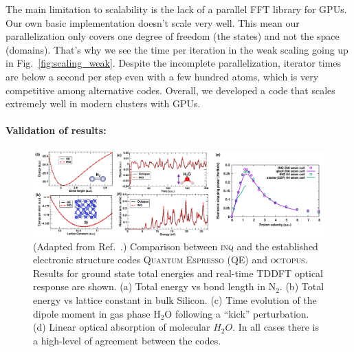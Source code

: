 The main limitation to scalability is the lack of a parallel FFT library for GPUs. 
Our own basic implementation doesn't scale very well. 
This mean our parallelization only covers one degree of freedom (the states) and not the space (domains). 
That's why we see the time per iteration in the weak scaling going up in Fig.~\ref{fig:scaling_weak}.
Despite the incomplete parallelization, iterator times are below a second per step even with a few hundred atoms, which is very competitive among alternative codes.
Overall, we developed a code that scales extremely well in modern clusters with GPUs.

\paragraph{Validation of results:}
\begin{figure}[h]
	\centering
	\includegraphics[width=0.66\linewidth]{figures/Results-Fig.pdf}
	\caption{
		(Adapted from Ref.~\cite{Andrade2021}.) 
		Comparison between \textsc{inq} and the established electronic structure codes \textsc{Quantum Espresso} (QE) and \textsc{octopus}.
Results for ground state total energies and real-time TDDFT optical response are shown. 
		(a) Total energy vs bond length in \(\mathrm{N_2}\).
		(b) Total energy vs lattice constant in bulk Silicon. 
		(c) Time evolution of the dipole moment in gas phase \(\mathrm{H_2O}\) following a ``kick'' perturbation. 
		(d) Linear optical absorption of molecular \(H_2O\). 
		In all cases there is a high-level of agreement between the codes.
	}
	\label{fig:inq_results}
\end{figure}

